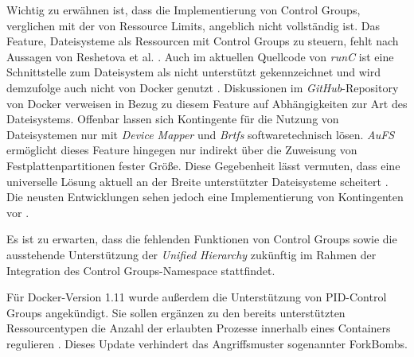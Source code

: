 \documentclass[../main.tex]{subfiles}
\begin{document}
		Wichtig zu erwähnen ist, dass die Implementierung von Control Groups, verglichen mit der von Ressource Limits, angeblich nicht vollständig ist. Das Feature, Dateisysteme als Ressourcen mit Control Groups zu steuern, fehlt nach Aussagen von Reshetova et al. \cite[S.19]{dockerSec2}. Auch im aktuellen Quellcode von \emph{runC} ist eine Schnittstelle zum Dateisystem als \glqq{}nicht unterstützt\grqq{} gekennzeichnet und wird demzufolge auch nicht von Docker genutzt \cite{githubRunCCgroups}. Diskussionen im \emph{GitHub}-Repository von Docker verweisen in Bezug zu diesem Feature auf Abhängigkeiten zur Art des Dateisystems. Offenbar lassen sich Kontingente für die Nutzung von Dateisystemen nur mit \emph{Device Mapper} und \emph{Brtfs} softwaretechnisch lösen. \emph{AuFS} ermöglicht dieses Feature hingegen nur indirekt über die Zuweisung von Festplattenpartitionen fester Größe. Diese Gegebenheit lässt vermuten, dass eine universelle Lösung aktuell an der Breite unterstützter Dateisysteme scheitert \cite{githubDockerIssueFsQuota}. Die neusten Entwicklungen sehen jedoch eine Implementierung von Kontingenten vor \cite{githubDockerPullBrtfs}.

		Es ist zu erwarten, dass die fehlenden Funktionen von Control Groups sowie die ausstehende Unterstützung der \emph{Unified Hierarchy} zukünftig im Rahmen der Integration des Control Groups-Namespace stattfindet.

		Für Docker-Version 1.11 wurde außerdem die Unterstützung von \acrshort{PID}-Control Groups angekündigt. Sie sollen ergänzen zu den bereits unterstützten Ressourcentypen die Anzahl der erlaubten Prozesse innerhalb eines Containers regulieren \cite{githubCgroupPID}\cite{docker110Security}. Dieses Update verhindert das Angriffsmuster sogenannter \glspl{ForkBomb}.


\end{document}
